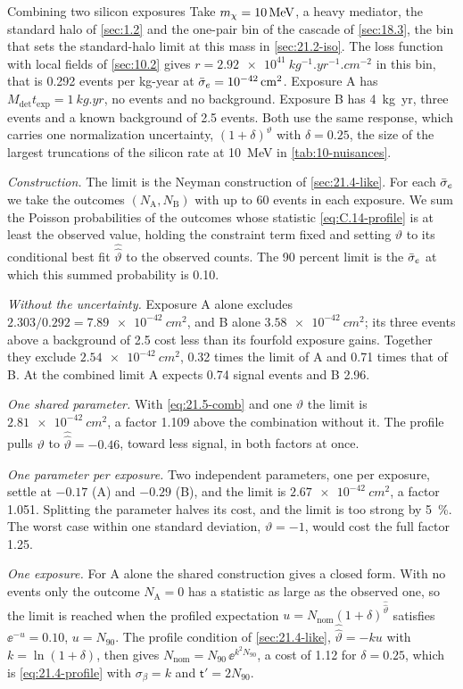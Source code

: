 \begin{workedexample}{Combining two silicon exposures}\label{we:21-combine}
Take $m_{\chi} = \SI{10}{MeV}$, a heavy mediator, the standard halo of \cref{sec:1.2} and the one-pair bin of the cascade of \cref{sec:18.3}, the bin that sets the standard-halo limit at this mass in \cref{sec:21.2-iso}. The loss function with local fields of \cref{sec:10.2} gives $r = \SI{2.92e41}{kg^{-1}.yr^{-1}.cm^{-2}}$ in this bin, that is 0.292 events per kg-year at $\bar{\sigma}_{e} = \SI{e-42}{cm^2}$. Exposure A has $M_{\mathrm{det}}t_{\mathrm{exp}} = \SI{1}{kg.yr}$, no events and no background. Exposure B has \SI{4}{kg.yr}, three events and a known background of 2.5 events. Both use the same response, which carries one normalization uncertainty, $(1 + \delta)^{\vartheta}$ with $\delta = 0.25$, the size of the largest truncations of the silicon rate at \SI{10}{MeV} in \cref{tab:10-nuisances}.

\emph{Construction.} The limit is the Neyman construction of \cref{sec:21.4-like}. For each $\bar{\sigma}_{e}$ we take the outcomes $(N_{\mathrm{A}}, N_{\mathrm{B}})$ with up to 60 events in each exposure. We sum the Poisson probabilities of the outcomes whose statistic \cref{eq:C.14-profile} is at least the observed value, holding the constraint term fixed and setting $\vartheta$ to its conditional best fit $\hat{\hat\vartheta}$ to the observed counts. The 90 percent limit is the $\bar{\sigma}_{e}$ at which this summed probability is 0.10.

\emph{Without the uncertainty.} Exposure A alone excludes $2.303/0.292 = \SI{7.89e-42}{cm^2}$, and B alone $\SI{3.58e-42}{cm^2}$; its three events above a background of 2.5 cost less than its fourfold exposure gains. Together they exclude $\SI{2.54e-42}{cm^2}$, 0.32 times the limit of A and 0.71 times that of B. At the combined limit A expects 0.74 signal events and B 2.96.

\emph{One shared parameter.} With \cref{eq:21.5-comb} and one $\vartheta$ the limit is $\SI{2.81e-42}{cm^2}$, a factor 1.109 above the combination without it. The profile pulls $\vartheta$ to $\hat{\hat\vartheta} = -0.46$, toward less signal, in both factors at once.

\emph{One parameter per exposure.} Two independent parameters, one per exposure, settle at $-0.17$ (A) and $-0.29$ (B), and the limit is $\SI{2.67e-42}{cm^2}$, a factor 1.051. Splitting the parameter halves its cost, and the limit is too strong by \SI{5}{\percent}. The worst case within one standard deviation, $\vartheta = -1$, would cost the full factor 1.25.

\emph{One exposure.} For A alone the shared construction gives a closed form. With no events only the outcome $N_{\mathrm{A}} = 0$ has a statistic as large as the observed one, so the limit is reached when the profiled expectation $u = N_{\mathrm{nom}}(1 + \delta)^{\hat{\hat\vartheta}}$ satisfies $\ee^{-u} = 0.10$, $u = N_{90}$. The profile condition of \cref{sec:21.4-like}, $\hat{\hat\vartheta} = -ku$ with $k = \ln(1 + \delta)$, then gives $N_{\mathrm{nom}} = N_{90}\,\ee^{k^2N_{90}}$, a cost of 1.12 for $\delta = 0.25$, which is \cref{eq:21.4-profile} with $\sigma_\beta = k$ and $\mathsf{t}' = 2N_{90}$.
\end{workedexample}

